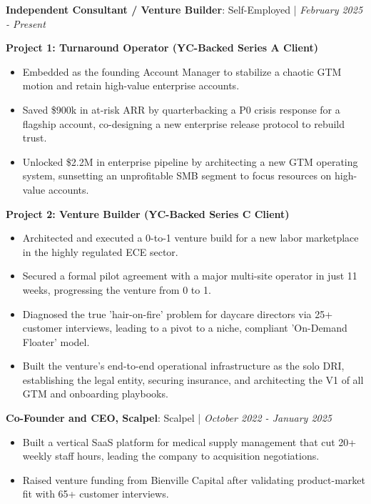 \documentclass[10pt,a4paper,withhyper]{altacv}
\newcommand{\atscvevent}[4]{%
  \textbf{#1}: #2 | \textit{#3}%
  \vspace{0.3em}%
}
\begin{document}



\makecvheader


\atscvevent{Independent Consultant / Venture Builder}{Self-Employed}{February 2025 - Present}{}

\textbf{Project 1: Turnaround Operator (YC-Backed Series A Client)}
\begin{itemize}
\item Embedded as the founding Account Manager to stabilize a chaotic GTM motion and retain high-value enterprise accounts.
\item Saved \$900k in at-risk ARR by quarterbacking a P0 crisis response for a flagship account, co-designing a new enterprise release protocol to rebuild trust.
\item Unlocked \$2.2M in enterprise pipeline by architecting a new GTM operating system, sunsetting an unprofitable SMB segment to focus resources on high-value accounts.
\end{itemize}

\textbf{Project 2: Venture Builder (YC-Backed Series C Client)}
\begin{itemize}
\item Architected and executed a 0-to-1 venture build for a new labor marketplace in the highly regulated ECE sector.
\item Secured a formal pilot agreement with a major multi-site operator in just 11 weeks, progressing the venture from 0 to 1.
\item Diagnosed the true 'hair-on-fire' problem for daycare directors via 25+ customer interviews, leading to a pivot to a niche, compliant 'On-Demand Floater' model.
\item Built the venture's end-to-end operational infrastructure as the solo DRI, establishing the legal entity, securing insurance, and architecting the V1 of all GTM and onboarding playbooks.
\end{itemize}

\atscvevent{Co-Founder and CEO, Scalpel}{Scalpel}{October 2022 - January 2025}{}
\begin{itemize}
\item Built a vertical SaaS platform for medical supply management that cut 20+ weekly staff hours, leading the company to acquisition negotiations.
\item Raised venture funding from Bienville Capital after validating product-market fit with 65+ customer interviews.
\end{itemize}
\end{document}
